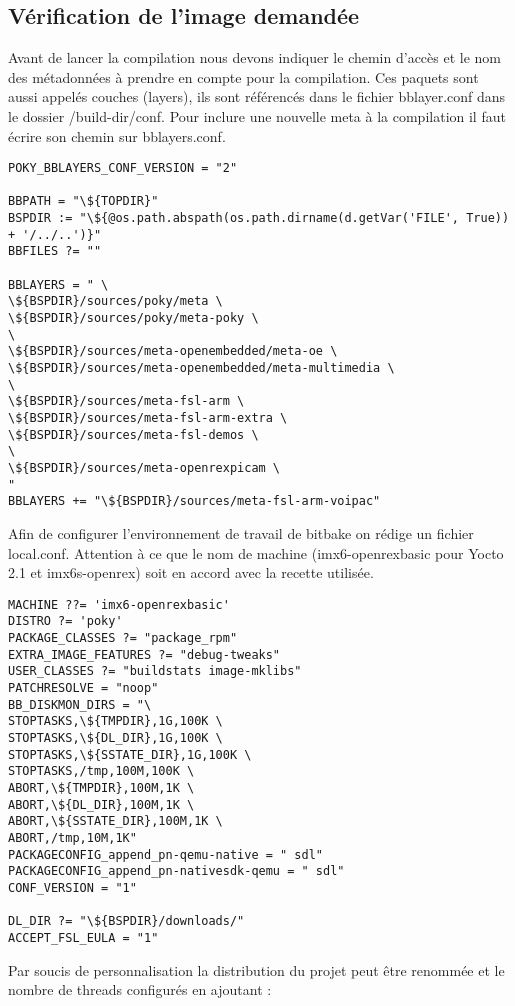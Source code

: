 \subsection{Vérification de l’image demandée}
Avant de lancer la compilation nous devons indiquer le chemin d’accès et
le nom des métadonnées à prendre en compte pour la compilation. Ces paquets
sont aussi appelés couches (layers), ils sont référencés dans le fichier
bblayer.conf dans le dossier /build-dir/conf. Pour inclure une nouvelle meta
à la compilation il faut écrire son chemin sur bblayers.conf.

\begin{lstlisting}
POKY_BBLAYERS_CONF_VERSION = "2"

BBPATH = "\${TOPDIR}"
BSPDIR := "\${@os.path.abspath(os.path.dirname(d.getVar('FILE', True)) + '/../..')}"
BBFILES ?= ""

BBLAYERS = " \
\${BSPDIR}/sources/poky/meta \
\${BSPDIR}/sources/poky/meta-poky \
\
\${BSPDIR}/sources/meta-openembedded/meta-oe \
\${BSPDIR}/sources/meta-openembedded/meta-multimedia \
\
\${BSPDIR}/sources/meta-fsl-arm \
\${BSPDIR}/sources/meta-fsl-arm-extra \
\${BSPDIR}/sources/meta-fsl-demos \
\
\${BSPDIR}/sources/meta-openrexpicam \
"
BBLAYERS += "\${BSPDIR}/sources/meta-fsl-arm-voipac"
\end{lstlisting}

Afin de configurer l’environnement de travail de bitbake on rédige un fichier local.conf. Attention à ce que le nom de machine (imx6-openrexbasic pour Yocto 2.1 et imx6s-openrex) soit en accord avec la recette utilisée.

\begin{lstlisting}
MACHINE ??= 'imx6-openrexbasic'
DISTRO ?= 'poky'
PACKAGE_CLASSES ?= "package_rpm"
EXTRA_IMAGE_FEATURES ?= "debug-tweaks"
USER_CLASSES ?= "buildstats image-mklibs"
PATCHRESOLVE = "noop"
BB_DISKMON_DIRS = "\
STOPTASKS,\${TMPDIR},1G,100K \
STOPTASKS,\${DL_DIR},1G,100K \
STOPTASKS,\${SSTATE_DIR},1G,100K \
STOPTASKS,/tmp,100M,100K \
ABORT,\${TMPDIR},100M,1K \
ABORT,\${DL_DIR},100M,1K \
ABORT,\${SSTATE_DIR},100M,1K \
ABORT,/tmp,10M,1K"
PACKAGECONFIG_append_pn-qemu-native = " sdl"
PACKAGECONFIG_append_pn-nativesdk-qemu = " sdl"
CONF_VERSION = "1"

DL_DIR ?= "\${BSPDIR}/downloads/"
ACCEPT_FSL_EULA = "1"
\end{lstlisting}

Par soucis de personnalisation la distribution du projet peut être renommée et le nombre de threads configurés en ajoutant :

